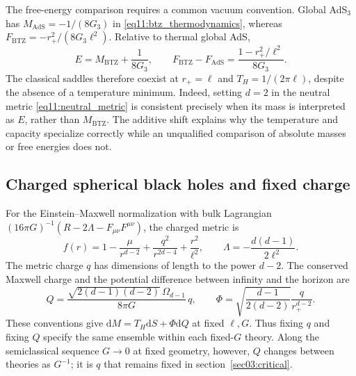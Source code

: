 \documentclass[11pt,letterpaper]{article}
\newcommand{\dd}{\mathrm{d}}
\theoremstyle{plain}
\theoremstyle{definition}
\theoremstyle{remark}
\begin{document}
The free-energy comparison requires a common vacuum convention.
Global AdS$_3$ has $M_{\mathrm{AdS}}=-1/(8G_3)$ in
\eqref{eq11:btz_thermodynamics}, whereas
$F_{\mathrm{BTZ}}=-r_+^2/(8G_3\ell^2)$.  Relative to thermal global AdS,
\begin{equation}
 E=M_{\mathrm{BTZ}}+\frac{1}{8G_3},\qquad
 F_{\mathrm{BTZ}}-F_{\mathrm{AdS}}
   =\frac{1-r_+^2/\ell^2}{8G_3}.
 \label{eq11:btz_vacuum_shift}
\end{equation}
The classical saddles therefore coexist at $r_+=\ell$ and
$T_H=1/(2\pi\ell)$, despite the absence of a temperature minimum.
Indeed, setting $d=2$ in the neutral metric
\eqref{eq11:neutral_metric} is consistent precisely when its mass is
interpreted as $E$, rather than $M_{\mathrm{BTZ}}$.  The additive shift
explains why the temperature and capacity specialize correctly while
an unqualified comparison of absolute masses or free energies does not.

\subsection{Charged spherical black holes and fixed charge}
\label{app11:charged}

For the Einstein--Maxwell normalization with bulk Lagrangian
$(16\pi G)^{-1}(R-2\Lambda-F_{\mu\nu}F^{\mu\nu})$, the charged metric is
\begin{equation}
 f(r)=1-\frac{\mu}{r^{d-2}}
         +\frac{q^2}{r^{2d-4}}+\frac{r^2}{\ell^2},
 \qquad
 \Lambda=-\frac{d(d-1)}{2\ell^2}.
 \label{eq11:charged_metric}
\end{equation}
The metric charge $q$ has dimensions of length to the power $d-2$.
The conserved Maxwell charge and the potential difference between
infinity and the horizon are \cite{chamblin1999}
\begin{equation}
 Q=\frac{\sqrt{2(d-1)(d-2)}\,\Omega_{d-1}}{8\pi G}\,q,
 \qquad
 \Phi=\sqrt{\frac{d-1}{2(d-2)}}\frac{q}{r_+^{d-2}}.
 \label{eq11:charge_normalization}
\end{equation}
These conventions give $\dd M=T_H\dd S+\Phi\dd Q$ at fixed $\ell,G$.
Thus fixing $q$ and fixing $Q$ specify the same ensemble within each
fixed-$G$ theory.  Along the semiclassical sequence $G\to0$ at fixed
geometry, however, $Q$ changes between theories as $G^{-1}$; it is $q$
that remains fixed in section~\ref{sec03:critical}.
\end{document}
